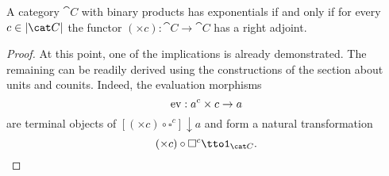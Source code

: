 \begin{proposition}
A category \(\cat C\) with binary products has exponentials if and only if for every \(c \in \obj{\cat C}\) the functor \((\times c) : \cat C \to \cat C\) has a right adjoint. 
\end{proposition}

\begin{proof}
At this point, one of the implications is already demonstrated. The remaining can be readily derived using the constructions of the section about units and counits.  Indeed, the evaluation morphisms
\[\operatorname{ev} : a^c \times c \to a\]
are terminal objects of \([(\times c) \circ \square^c] \downarrow a\) and form a natural transformation
\[(\times c) \circ \square^c \tto \id_{\cat C} .\]
 
\end{proof}

